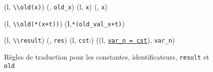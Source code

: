\begin{figure*}[h!]
  \scriptsize{
    {
      {}
      {(l, \mbox{\lstinline'\\old(x)'}) 
        (\emptylist, \mbox{\lstinline'old_x'})}{}
    }
    {
      {}
      {(l, \mbox{\lstinline'x'}) 
        (\emptylist, \mbox{\lstinline'x'})}{}
    }

    {
      {}
      {(l, \mbox{\lstinline'\\old(*(x+t))'}) 
        (I,\mbox{\lstinline'*(old_val_x+t)'})}{}
    }

    {
      {}
      {(l, \mbox{\lstinline'\\result'}) 
        (\emptylist, \mbox{\lstinline'res'})}{}
    }
    {
      {}
      {(l, \mbox{\lstinline'cst'}:) 
        ((l, \underline{\Zinit\mbox{\lstinline'var_n = cst'}}\semicolon),
        \mbox{\lstinline'var_n'})}{}
    }
  }
  \caption{Règles de traduction pour les constantes, identificateurs,
    \lstinline'result' et \lstinline'old'}
  \label{fig:const-id}
\end{figure*}
